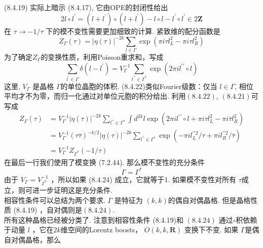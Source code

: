  (8.4.19) 实际上暗示 (8.4.17), 它由OPE的封闭性给出
\begin{equation}
	2 l \circ l^{\prime}=\left(l+l^{\prime}\right) \circ\left(l+l^{\prime}\right)-l \circ l-l^{\prime} \circ l^{\prime} \in 2 \mathbf{Z}
\end{equation}
在 $\tau \rightarrow-1 / \tau$ 下的模不变性需要更加细致的计算. 紧致维的配分函数是
\begin{equation}
	Z_{\Gamma}(\tau)=|\eta(\tau)|^{-2 k} \sum_{l \in \Gamma} \exp \left(\pi i \tau l_{L}^{2}-\pi i \tau l_{R}^{2}\right)
\end{equation}
为了确定$Z_{\Gamma}$的变换性质，利用Poisson重求和，写成
\begin{equation}
	\sum_{l^{\prime} \in \Gamma} \delta\left(l-l^{\prime}\right)=V_{\Gamma}^{-1} \sum_{l^{\prime \prime} \in \Gamma^{*}} \exp \left(2 \pi i l^{\prime \prime} \circ l\right)
\end{equation}
这里, $V_{\Gamma}$ 是晶格 $\Gamma$的单位晶胞的体积.  (8.4.22)类似Fourier级数：仅当 $l \in \Gamma$, 相位平均才不为零，而归一化通过对单位元胞的积分给出. 利用$(8.4 .22)$,  $(8.4 .21)$可写成
\begin{equation}
	\begin{aligned}
		Z_{\Gamma}(\tau) &=V_{\Gamma}^{-1}|\eta(\tau)|^{-2 k} \sum_{l^{\prime \prime} \in \Gamma^{*}} \int d^{2 k} l \exp \left(2 \pi i l^{\prime \prime} \circ l+\pi i \tau l_{L}^{2}-\pi i \bar{\tau} l_{R}^{2}\right) \\
		&=V_{\Gamma}^{-1}(\tau \bar{\tau})^{-k / 2}|\eta(\tau)|^{-2 k} \sum_{l^{\prime \prime} \in \Gamma^{*}} \exp \left(-\pi i l_{L}^{\prime \prime 2} / \tau+\pi i l_{R}^{\prime \prime 2} / \bar{\tau}\right) \\
		&=V_{\Gamma}^{-1} Z_{\Gamma^{*}}(-1 / \tau)
	\end{aligned}
\end{equation}
在最后一行我们使用了模变换 (7.2.44). 那么模不变性的充分条件
\begin{equation}
	\Gamma=\Gamma^{*}
\end{equation}
由于 $V_{\Gamma}=V_{\Gamma^{*}}^{-1}$ ，所以如果 (8.4.24) 成立，它就等于1. 如果模不变性对所有 $\tau$成立，则可进一步证明这是充分条件.\\
相容性条件可以总结为两个要求.  $\Gamma$ 是特征为 $(k, k)$的偶自对偶晶格. 但是晶格性质 (8.4.19) ，自对偶则是$(8.4 .24)$.\\
所有这种晶格已经被分类了. 注意到相容性条件 (8.4.19)和 $(8.4 .24)$ 通过$\circ$积依赖于动量 $l$ ，它在$2 k$维空间的Lorentz boosts， $O(k, k, \mathbf{R})$ 变换下不变. 如果 $\Gamma$是偶自对偶晶格，那么
